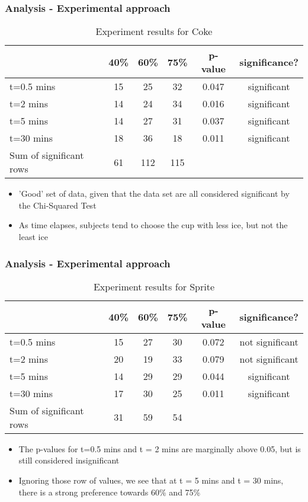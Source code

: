 \documentclass[compress,handout,10pt]{beamer}
\let\olditem\item
\renewcommand{\item}{\setlength{\itemsep}{0.5\baselineskip}\olditem}
\begin{document}
\begin{frame}
    \frametitle{Analysis - Experimental approach}
\begin{table}[ h]
\centering
\begin{tabular}{ l || c|c|c||c|c }
  &40\% &60\% & 75\% &p-value &significance? \\
\hline  
t=0.5 mins & 15 & 25 & 32 & 0.047&significant\\ 
\hline  
t=2 mins & 14 & 24 & 34&0.016&significant\\ 
\hline  
t=5 mins & 14 & 27 & 31&0.037&significant\\ 
\hline  
t=30 mins & 18 & 36 & 18&0.011&significant\\ 
\hline
Sum of significant rows & 61 & 112 & 115 & & \\ 
\hline     
 \end{tabular}
\caption{Experiment results for Coke}
\end{table}

\begin{itemize}
\item 'Good' set of data, given that the data set are all considered significant by the Chi-Squared Test
\item As time elapses, subjects tend to choose the cup with less ice, but not the least ice
\end{itemize}
\end{frame}


\begin{frame}
    \frametitle{Analysis - Experimental approach}
\begin{table}[ h]
\centering
\begin{tabular}{ l || c|c|c||c|c }
  &40\% &60\% & 75\% &p-value &significance? \\
\hline  
t=0.5 mins & 15 & 27 & 30&0.072&not significant\\ 
\hline  
t=2 mins & 20 & 19 & 33&0.079&not significant\\ 
\hline  
t=5 mins & 14 & 29 & 29&0.044&significant\\ 
\hline  
t=30 mins & 17 & 30 & 25&0.011&significant\\ 
\hline  
Sum of significant rows & 31 & 59 & 54 & & \\ 
\hline     

 \end{tabular}
\caption{Experiment results for Sprite}
\end{table}

\begin{itemize}
\item The p-values for t=0.5 mins and t = 2 mins are marginally above 0.05, but is still considered insignificant
\item Ignoring those row of values, we see that at t = 5 mins and t = 30 mins, there is a strong preference towards 60\% and 75\%
\end{itemize}
\end{frame}
\end{document}
